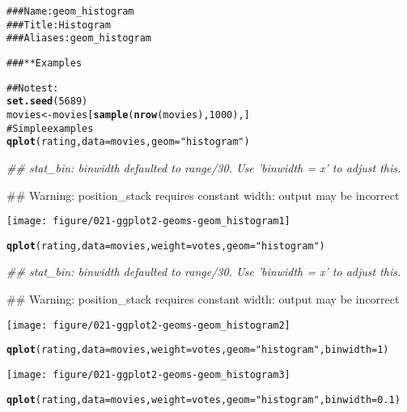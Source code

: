 \documentclass[a4paper,titlepage]{tufte-handout}\usepackage{graphicx, color}
\makeatletter
\def\maxwidth{ %
  \ifdim\Gin@nat@width>\linewidth
    \linewidth
  \else
    \Gin@nat@width
  \fi
}
\newcommand{\hlfunctioncall}[1]{\textcolor[rgb]{0.501960784313725,0,0.329411764705882}{\textbf{#1}}}%
\newcommand{\hlstring}[1]{\textcolor[rgb]{0.6,0.6,1}{#1}}%
\newcommand{\hlcomment}[1]{\textcolor[rgb]{0.180392156862745,0.6,0.341176470588235}{#1}}%
\newenvironment{kframe}{%
 \def\at@end@of@kframe{}%
 \ifinner\ifhmode%
  \def\at@end@of@kframe{\end{minipage}}%
  \begin{minipage}{\columnwidth}%
 \fi\fi%
 \def\FrameCommand##1{\hskip\@totalleftmargin \hskip-\fboxsep
 \colorbox{shadecolor}{##1}\hskip-\fboxsep
     \hskip-\linewidth \hskip-\@totalleftmargin \hskip\columnwidth}%
 \MakeFramed {\advance\hsize-\width
   \@totalleftmargin\z@ \linewidth\hsize
   \@setminipage}}%
 {\par\unskip\endMakeFramed%
 \at@end@of@kframe}
\newenvironment{knitrout}{}{} %
\makeatother
\begin{document}
\begin{knitrout}
\color{fgcolor}\begin{kframe}
\begin{alltt}
\hlcomment{### Name: geom_histogram}
\hlcomment{### Title: Histogram}
\hlcomment{### Aliases: geom_histogram}

\hlcomment{### ** Examples}

\hlcomment{## No test: }
\hlfunctioncall{set.seed}(5689)
movies <- movies[\hlfunctioncall{sample}(\hlfunctioncall{nrow}(movies), 1000), ]
\hlcomment{# Simple examples}
\hlfunctioncall{qplot}(rating, data=movies, geom=\hlstring{"histogram"})
\end{alltt}


{\ttfamily\noindent\itshape\textcolor{messagecolor}{\#\# stat\_bin: binwidth defaulted to range/30. Use 'binwidth = x' to adjust this.}}

{\ttfamily\noindent\textcolor{warningcolor}{\#\# Warning: position\_stack requires constant width: output may be incorrect}}\end{kframe}
\texttt{[image: figure/021-ggplot2-geoms-geom\_histogram1]} 
\begin{kframe}\begin{alltt}
\hlfunctioncall{qplot}(rating, data=movies, weight=votes, geom=\hlstring{"histogram"})
\end{alltt}


{\ttfamily\noindent\itshape\textcolor{messagecolor}{\#\# stat\_bin: binwidth defaulted to range/30. Use 'binwidth = x' to adjust this.}}

{\ttfamily\noindent\textcolor{warningcolor}{\#\# Warning: position\_stack requires constant width: output may be incorrect}}\end{kframe}
\texttt{[image: figure/021-ggplot2-geoms-geom\_histogram2]} 
\begin{kframe}\begin{alltt}
\hlfunctioncall{qplot}(rating, data=movies, weight=votes, geom=\hlstring{"histogram"}, binwidth=1)
\end{alltt}
\end{kframe}
\texttt{[image: figure/021-ggplot2-geoms-geom\_histogram3]} 
\begin{kframe}\begin{alltt}
\hlfunctioncall{qplot}(rating, data=movies, weight=votes, geom=\hlstring{"histogram"}, binwidth=0.1)
\end{alltt}



\end{kframe}
\end{knitrout}
\end{document}
